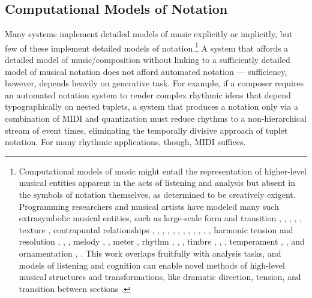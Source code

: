 \subsection{Computational Models of Notation}

Many systems implement detailed models of music explicitly or implicitly, but few of these implement detailed models of notation.\footnote{Computational models of music might entail the representation of higher-level musical entities apparent in the acts of listening and analysis but absent in the symbols of notation themselves, as determined to be creatively exigent. Programming researchers and musical artists have modeled many such extrasymbolic musical entities, such as large-scale form and transition \cite{polansky1991morphological}, \cite{uno1994temporal}, \cite{dobrian1995algorithmic}, \cite{abrams1999higher}, \cite{Yoo1983}, texture \cite{Horenstein:2004kx}, contrapuntal relationships \cite{Boenn:2009oq}, \cite{Acevedo2005}, \cite{Anders:2011kl}, \cite{Balser:1990tg}, \cite{Jones:2000hc}, \cite{uno1994temporal}, \cite{Bell:1995ij}, \cite{farbood2001analysis}, \cite{Cope:2002fv}, \cite{Laurson:2005dz}, \cite{Polansky:2011fu}, \cite{Ebcioglu:1980kl}, harmonic tension and resolution \cite{Melo2003}, \cite{Wiggins1999}, \cite{Foster:1995qa}, melody \cite{Hornel:1993mi}, \cite{Smith:1992pi}, meter \cite{Hamanaka:2005ff}, rhythm \cite{Nauert2007}, \cite{Degazio:1996lh}, \cite{Collins:2003bs}, timbre \cite{Xenakis:1991fu}, \cite{Creasey:1996ye}, \cite{Osaka2004}, temperament \cite{Seymour:2007qo}, \cite{Graf:2006il}, and ornamentation \cite{Ariza:2003zt}, \cite{Chico-Topfer:1998jl}. This work overlaps fruitfully with analysis tasks, and models of listening and cognition can enable novel methods of high-level musical structures and transformations, like dramatic direction, tension, and transition between sections \cite[108]{Collins2009}.} A system that affords a detailed model of music/composition without linking to a sufficiently detailed model of musical notation does not afford automated notation --- sufficiency, however, depends heavily on generative task. For example, if a composer requires an automated notation system to render complex rhythmic ideas that depend typographically on nested tuplets, a system that produces a notation only via a combination of MIDI and quantization must reduce rhythms to a non-hierarchical stream of event times, eliminating the temporally divisive approach of tuplet notation. For many rhythmic applications, though, MIDI suffices. 

